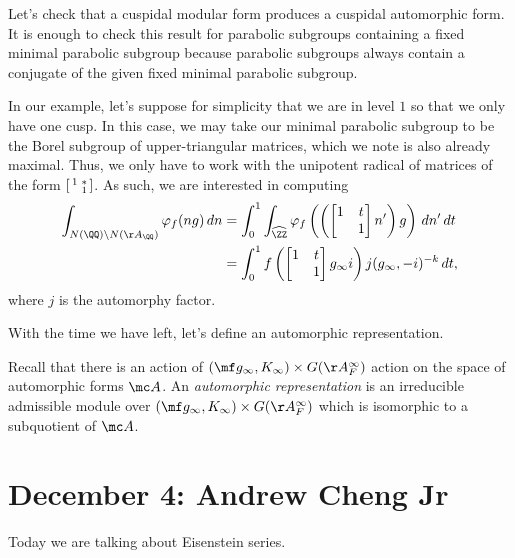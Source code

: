 \documentclass{article}
\begin{document}
\begin{listalph}
	\item Let's check that a cuspidal modular form produces a cuspidal automorphic form. It is enough to check this result for parabolic subgroups containing a fixed minimal parabolic subgroup because parabolic subgroups always contain a conjugate of the given fixed minimal parabolic subgroup.
	
	In our example, let's suppose for simplicity that we are in level $1$ so that we only have one cusp. In this case, we may take our minimal parabolic subgroup to be the Borel subgroup of upper-triangular matrices, which we note is also already maximal. Thus, we only have to work with the unipotent radical of matrices of the form $\begin{bsmallmatrix}
		1 & * \\ & 1
	\end{bsmallmatrix}$. As such, we are interested in computing
	\begin{align*}
		\int_{N(\QQ)\backslash N(\AA_\QQ)}\varphi_f(ng)\,dn &= \int_0^1\int_{\widehat\ZZ}\varphi_f\left(\left(\begin{bmatrix}
			1 & t \\ & 1
		\end{bmatrix}n'\right)g\right)\,dn'\,dt \\
		&= \int_0^1f\left(\begin{bmatrix}
			1 & t \\ & 1
		\end{bmatrix}g_\infty i\right)j(g_\infty,-i)^{-k}\,dt,
	\end{align*}
	where $j$ is the automorphy factor.
\end{listalph}
With the time we have left, let's define an automorphic representation.
\begin{definition}
	Recall that there is an action of $(\mf g_\infty,K_\infty)\times G(\AA_F^\infty)$ action on the space of automorphic forms $\mc A$. An \textit{automorphic representation} is an irreducible admissible module over $(\mf g_\infty,K_\infty)\times G(\AA_F^\infty)$ which is isomorphic to a subquotient of $\mc A$.
\end{definition}

\section{December 4: Andrew Cheng Jr}
Today we are talking about Eisenstein series.
\end{document}
